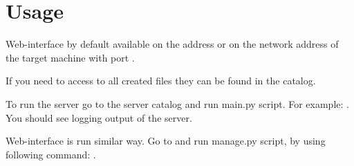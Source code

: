 \documentclass[12pt]{article}
\begin{document}
\section{Usage}
\par Web-interface by default available on the address
 or on the network address of the target machine 
with port .
\par If you need to access to all created files they can be found in the
 catalog.
\par To run the server go to the server catalog and run main.py script. For
example: . You should see logging output of the server.
\par Web-interface is run similar way. Go to  and 
run manage.py script, by using following command: .

\end{document}

